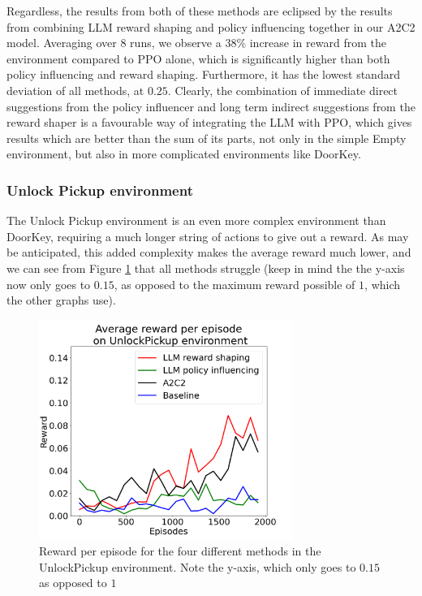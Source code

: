 \documentclass[conference]{IEEEtran}
\begin{document}
Regardless, the results from both of these methods are eclipsed by the results from combining LLM reward shaping and policy influencing together in our A2C2 model. Averaging over 8 runs, we observe a $38\%$ increase in reward from the environment compared to PPO alone, which is significantly higher than both policy influencing and reward shaping. Furthermore, it has the lowest standard deviation of all methods, at $0.25$. Clearly, the combination of immediate direct suggestions from the policy influencer and long term indirect suggestions from the reward shaper is a favourable way of integrating the LLM with PPO, which gives results which are better than the sum of its parts, not only in the simple Empty environment, but also in more complicated environments like DoorKey.


\subsubsection{Unlock Pickup environment}

The Unlock Pickup environment is an even more complex environment than DoorKey, requiring a much longer string of actions to give out a reward. As may be anticipated, this added complexity makes the average reward much lower, and we can see from Figure \ref{unlockpickupresults} that all methods struggle (keep in mind the the y-axis now only goes to $0.15$, as opposed to the maximum reward possible of $1$, which the other graphs use).

\begin{figure}[h]
\centerline{\includegraphics[width=3.25in]{figure/unlockpickupresults.png}}
\caption{Reward per episode for the four different methods in the UnlockPickup environment. Note the y-axis, which only goes to $0.15$ as opposed to $1$}
\label{unlockpickupresults}
\end{figure}
\end{document}
